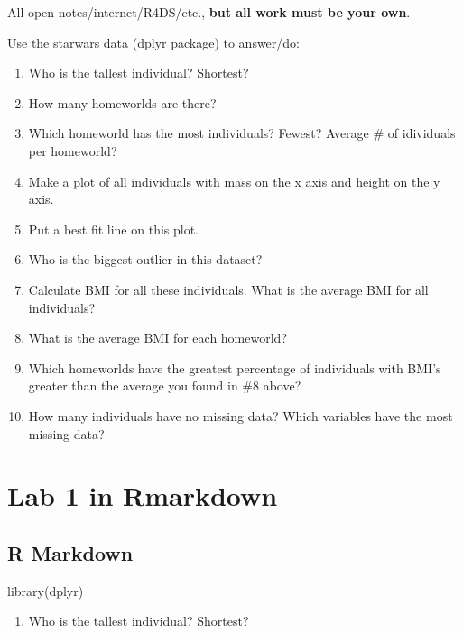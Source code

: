 \documentclass[
]{book}
\newenvironment{Shaded}{\begin{snugshade}}{\end{snugshade}}
\newcommand{\FunctionTok}[1]{\textcolor[rgb]{0.00,0.00,0.00}{#1}}
\newcommand{\NormalTok}[1]{#1}
\providecommand{\tightlist}{%
  \setlength{\itemsep}{0pt}\setlength{\parskip}{0pt}}
\begin{document}
All open notes/internet/R4DS/etc., \textbf{but all work must be your own}.

Use the starwars data (dplyr package) to answer/do:

\begin{enumerate}
\def\labelenumi{\arabic{enumi}.}
\tightlist
\item
  Who is the tallest individual? Shortest?
\item
  How many homeworlds are there?
\item
  Which homeworld has the most individuals? Fewest? Average \# of idividuals per homeworld?
\item
  Make a plot of all individuals with mass on the x axis and height on the y axis.
\item
  Put a best fit line on this plot.
\item
  Who is the biggest outlier in this dataset?
\item
  Calculate BMI for all these individuals. What is the average BMI for all individuals?
\item
  What is the average BMI for each homeworld?
\item
  Which homeworlds have the greatest percentage of individuals with BMI's greater than the average you found in \#8 above?
\item
  How many individuals have no missing data? Which variables have the most missing data?
\end{enumerate}

\hypertarget{lab-1-in-rmarkdown}{%
\chapter{Lab 1 in Rmarkdown}\label{lab-1-in-rmarkdown}}

\hypertarget{r-markdown}{%
\section{R Markdown}\label{r-markdown}}

\begin{Shaded}
\begin{Highlighting}[]
\FunctionTok{library}\NormalTok{(dplyr)}
\end{Highlighting}
\end{Shaded}

\begin{enumerate}
\def\labelenumi{\arabic{enumi}.}
\tightlist
\item
  Who is the tallest individual? Shortest?
\end{enumerate}
\end{document}
